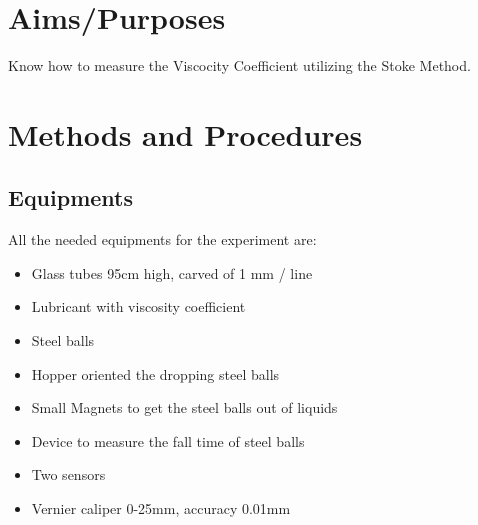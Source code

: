 \newcommand{\mytitle}{Physics Laboratory Report}
\newcommand{\myauthors}{Group 3A - CC04: Pham Huy Thien Phuc, Tran Huy Hoang, Truc Hoan Phat, Le Phu Thanh, Nguyen Tran Phuong Nhi}
\newcommand{\mydate}{January, 2022}


\usepackage{amsfonts, amsmath, amsthm}
\usepackage{wrapfig} %
\usepackage{hyperref}
\newtheorem*{formula}{Formula}




\ClearWallPaper %

\newpage
\tableofcontents
\newpage
\listoffigures
\newpage
\listoftables

\newpage {} \setcounter{page}{1}

\section{Aims/Purposes}
Know how to measure the Viscocity Coefficient utilizing the Stoke Method.

\section{Methods and Procedures}
\subsection{Equipments}
All the needed equipments for the experiment are:
\begin{itemize}
    \item Glass tubes 95cm high, carved of 1 mm / line 
    \item Lubricant with viscosity coefficient 
    \item Steel balls
    \item Hopper oriented the dropping steel balls
    \item Small Magnets to get the steel balls out of liquids
    \item Device to measure the fall time of steel balls
    \item Two sensors
    \item Vernier caliper 0-25mm, accuracy 0.01mm
\end{itemize}

